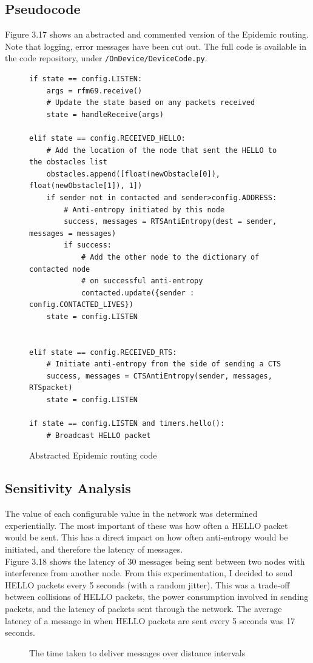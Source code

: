 \documentclass[12pt,a4paper]{report}
\begin{document}
\subsection{Pseudocode}
Figure 3.17 shows an abstracted and commented version of the Epidemic routing. Note that logging, error messages have been cut out. The full code is available in the code repository, under \verb'/OnDevice/DeviceCode.py'.
\begin{figure}[h] 
\begin{verbatim}
if state == config.LISTEN:
    args = rfm69.receive()
    # Update the state based on any packets received
    state = handleReceive(args) 

elif state == config.RECEIVED_HELLO:
    # Add the location of the node that sent the HELLO to the obstacles list
    obstacles.append([float(newObstacle[0]), float(newObstacle[1]), 1])
    if sender not in contacted and sender>config.ADDRESS:
        # Anti-entropy initiated by this node
        success, messages = RTSAntiEntropy(dest = sender, messages = messages)
        if success:
            # Add the other node to the dictionary of contacted node 
            # on successful anti-entropy
            contacted.update({sender : config.CONTACTED_LIVES})
    state = config.LISTEN

    
elif state == config.RECEIVED_RTS:
    # Initiate anti-entropy from the side of sending a CTS       
    success, messages = CTSAntiEntropy(sender, messages, RTSpacket)
    state = config.LISTEN

if state == config.LISTEN and timers.hello():
    # Broadcast HELLO packet
\end{verbatim}
\caption{Abstracted Epidemic routing code}
\end{figure}
\FloatBarrier

\subsection{Sensitivity Analysis}
The value of each configurable value in the network was determined experientially. The most important of these was how often a HELLO packet would be sent. This has a direct impact on how often anti-entropy would be initiated, and therefore the latency of messages. \\ 
Figure 3.18 shows the latency of 30 messages being sent between two nodes with interference from another node. From this experimentation, I decided to send HELLO packets every 5 seconds (with a random jitter). This was a trade-off between collisions of HELLO packets, the power consumption involved in sending packets, and the latency of packets sent through the network. The average latency of a message in when HELLO packets are sent every 5 seconds was 17 seconds. 
\begin{figure}[h]
\begin{center}

\end{center}
\caption{The time taken to deliver messages over distance intervals}
\end{figure}
\FloatBarrier
\end{document}
